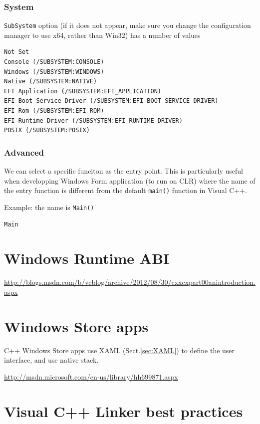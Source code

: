 \subsubsection{System}
\label{sec:configuration-properties_Linker_subsystem}

\verb!SubSystem! option (if it does not appear, make sure you change the
configuration manager to use x64, rather than Win32) has a number of values

\begin{verbatim}
Not Set
Console (/SUBSYSTEM:CONSOLE)
Windows (/SUBSYSTEM:WINDOWS)
Native (/SUBSYSTEM:NATIVE)
EFI Application (/SUBSYSTEM:EFI_APPLICATION)
EFI Boot Service Driver (/SUBSYSTEM:EFI_BOOT_SERVICE_DRIVER)
EFI Rom (/SUBSYSTEM:EFI_ROM)
EFI Runtime Driver (/SUBSYSTEM:EFI_RUNTIME_DRIVER)
POSIX (/SUBSYSTEM:POSIX)
\end{verbatim}

\subsubsection{Advanced}

We can select a specific funciton as the entry point. This is particularly
useful when developping Windows Form application (to run on CLR) where the name
of the entry function is different from the default \verb!main()! function in
Visual C++.

Example: the name is \verb!Main()! 
\begin{verbatim}
Main
\end{verbatim}


\section{Windows Runtime ABI}
\label{sec:Windows-Runtime-ABI}

\url{http://blogs.msdn.com/b/vcblog/archive/2012/08/30/cxxcxpart00anintroduction.aspx}

\section{Windows Store apps}
\label{sec:Windows-store-apps}

C++ Windows Store apps use XAML (Sect.\ref{sec:XAML}) to define the user
interface, and use native stack. 

\url{http://msdn.microsoft.com/en-us/library/hh699871.aspx}

\section{Visual C++ Linker best practices}
\label{sec:Linker_VisualC++}

